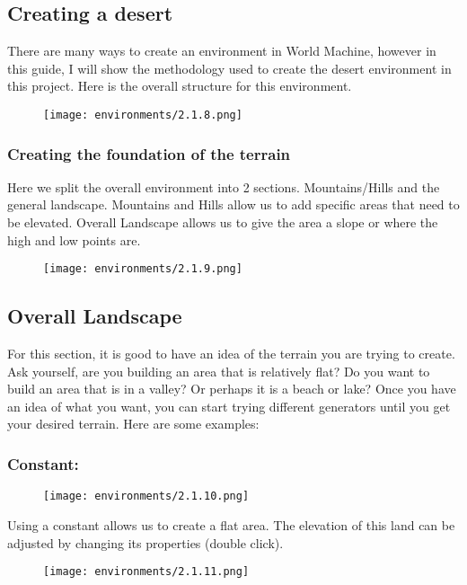 \documentclass[../main.tex]{subfiles}
\begin{document}
\subsection{Creating a desert}
There are many ways to create an environment in World Machine, however in this guide, I will show the methodology used to create the desert environment in this project.
Here is the overall structure for this environment.
\begin{figure}[H]
\texttt{[image: environments/2.1.8.png]}
\end{figure}
\subsubsection{Creating the foundation of the terrain}
Here we split the overall environment into 2 sections. Mountains/Hills and the general landscape. Mountains and Hills allow us to add specific areas that need to be elevated.
Overall Landscape allows us to give the area a slope or where the high and low points are.
\begin{figure}[H]
\texttt{[image: environments/2.1.9.png]}
\end{figure}
\subsection{Overall Landscape}
For this section, it is good to have an idea of the terrain you are trying to create.
Ask yourself, are you building an area that is relatively flat? Do you want to build an area that is in a valley? Or perhaps it is a beach or lake?
Once you have an idea of what you want, you can start trying different generators until you get your desired terrain. Here are some examples:

\subsubsection{Constant:}
\begin{figure}[H]
\texttt{[image: environments/2.1.10.png]}
\end{figure}
Using a constant allows us to create a flat area. The elevation of this land can be adjusted by changing its properties (double click).
\begin{figure}[H]
\texttt{[image: environments/2.1.11.png]}
\end{figure}
\end{document}
